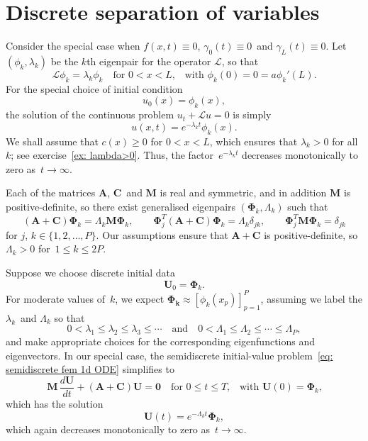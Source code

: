 \section{Discrete separation of variables}\label{sec: discrete separation}
Consider the special case when $f(x,t)\equiv0$, $\gamma_0(t)\equiv0$~and 
$\gamma_L(t)\equiv0$.  Let $(\phi_k,\lambda_k)$ be the $k$th eigenpair for the 
operator $\mathcal{L}$, so that
\[
\mathcal{L}\phi_k=\lambda_k\phi_k\quad\text{for $0<x<L$,}\quad
\text{with $\phi_k(0)=0=a\phi_k'(L)$.}
\]
For the special choice of initial condition
\[
u_0(x)=\phi_k(x),
\]
the solution of the continuous problem $u_t+\mathcal{L}u=0$ is simply
\begin{equation}\label{eq: u0 eigenfunction}
u(x,t)=e^{-\lambda_kt}\phi_k(x).
\end{equation}
We shall assume that $c(x)\ge0$ for $0<x<L$, which ensures that $\lambda_k>0$ 
for all~$k$; see exercise~\ref{ex: lambda>0}.  Thus, the 
factor~$e^{-\lambda_kt}$ decreases monotonically to zero as~$t\to\infty$.

Each of the matrices $\boldsymbol{A}$, $\boldsymbol{C}$~and $\boldsymbol{M}$ is 
real and symmetric, and in addition $\boldsymbol{M}$ is positive-definite, so 
there exist generalised eigenpairs $(\boldsymbol{\Phi}_k,\Lambda_k)$ such that 
\[
(\boldsymbol{A}+\boldsymbol{C})\boldsymbol{\Phi}_k
    =\Lambda_k\boldsymbol{M}\boldsymbol{\Phi}_k,\qquad
\boldsymbol{\Phi}_j^T(\boldsymbol{A}+\boldsymbol{C})\boldsymbol{\Phi}_k
    =\Lambda_k\delta_{jk},\qquad
\boldsymbol{\Phi}_j^T\boldsymbol{M}\boldsymbol{\Phi}_k=\delta_{jk}
\]
for $j$, $k\in\{1,2,\ldots,P\}$.  Our assumptions ensure that 
$\boldsymbol{A}+\boldsymbol{C}$ is positive-definite, so $\Lambda_k>0$ 
for~$1\le k\le2P$.

Suppose we choose discrete initial data
\[
\boldsymbol{U}_0=\boldsymbol{\Phi}_k.
\]
For moderate values of~$k$, we expect 
$\boldsymbol{\Phi_k}\approx[\phi_k(x_p)]_{p=1}^P$, assuming we label the 
$\lambda_k$~and $\Lambda_k$ so that
\[
0<\lambda_1\le\lambda_2\le\lambda_3\le\cdots
\quad\text{and}\quad
0<\Lambda_1\le\Lambda_2\le\cdots\le\Lambda_P,
\]
and make appropriate choices for the corresponding eigenfunctions and 
eigenvectors. In our special case, the semidiscrete initial-value 
problem~\eqref{eq: semidiscrete fem 1d ODE} simplifies to
\[
\boldsymbol{M}\,\frac{d\boldsymbol{U}}{dt}
+(\boldsymbol{A}+\boldsymbol{C})\boldsymbol{U}=\boldsymbol{0}
    \quad\text{for $0\le t\le T$,}
    \quad\text{with $\boldsymbol{U}(0)=\boldsymbol{\Phi}_k$,}
\]
which has the solution
\begin{equation}
\boldsymbol{U}(t)=e^{-\Lambda_kt}\boldsymbol{\Phi}_k,
\end{equation}
which again decreases monotonically to zero as~$t\to\infty$.

